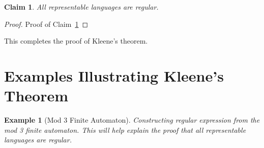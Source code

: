 \documentclass[12 pt, twoside, letterpaper]{article}
\newcommand{\meo}[1]{\texttt{#1}}
\renewcommand{\meo}[1]{\iffalse #1 \fi}
\newcommand{\refprop}[1]{Claim~\ref{#1}}
\theoremstyle{definition}
\theoremstyle{remark}
\theoremstyle{plain}
\newtheorem*{example}{Example}
\newtheorem{claim}{Claim}
\begin{document}
	\begin{claim}
	\label{prop:representable_languages_regular}
		All representable languages are regular.
	\end{claim}

	\begin{proof}
		Proof of \refprop{prop:representable_languages_regular}
	\end{proof}
	

	This completes the proof of Kleene's theorem.



\section{Examples Illustrating Kleene's Theorem} %
\label{sec:examples}

	\begin{example}[Mod 3 Finite Automaton]
		Constructing regular expression from the mod 3 finite automaton.
		This will help explain the proof that all representable languages are regular.
	\end{example}

	\meo{
		Figure out if there are any other parts of the proof that deserve an example to help explain them.
		I will probably include pictures for regular language $\iff$ representable in the initial proof.
	}

\meo{
	Look into any background or motivation that might be good to include.
	Anything about the importance of Kleene's theorem to the implementation of actual software might be good to include.
	But I worry about including too much practical CS in what really should be a math paper.
}
\end{document}
